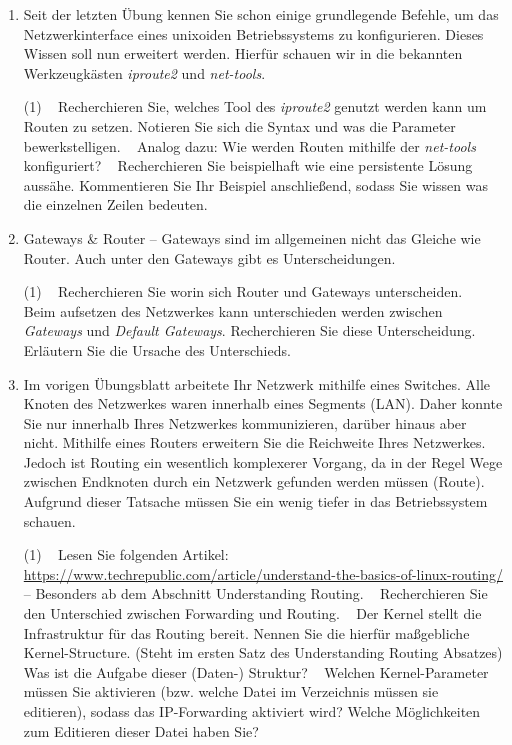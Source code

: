 \documentclass[paper=a4,fontsize=11pt]{scrartcl}%
\numberwithin{equation}{section}
\begin{document}
\begin{enumerate}
	\item Seit der letzten Übung kennen Sie schon einige grundlegende Befehle, um das Netzwerkinterface eines unixoiden Betriebssystems zu konfigurieren. Dieses Wissen soll nun erweitert werden. Hierfür schauen wir in die bekannten Werkzeugkästen \emph{iproute2} und \emph{net-tools}.
	\begin{tasks}(1)
	\task~ Recherchieren Sie, welches Tool des \emph{iproute2} genutzt werden kann um Routen zu setzen. Notieren Sie sich die Syntax und was die Parameter bewerkstelligen.
	\task~ Analog dazu: Wie werden Routen mithilfe der \emph{net-tools} konfiguriert?
	\task~ Recherchieren Sie beispielhaft wie eine persistente Lösung aussähe. Kommentieren Sie Ihr Beispiel anschließend, sodass Sie wissen was die einzelnen Zeilen bedeuten.
	\end{tasks}
	\item Gateways \& Router -- Gateways sind im allgemeinen nicht das Gleiche wie Router. Auch unter den Gateways gibt es Unterscheidungen.
	\begin{tasks}(1)
	\task~ Recherchieren Sie worin sich Router und Gateways unterscheiden.
	\task~ Beim aufsetzen des Netzwerkes kann unterschieden werden zwischen \emph{Gateways} und \emph{Default Gateways}. Recherchieren Sie diese Unterscheidung. Erläutern Sie die Ursache des Unterschieds.
	\end{tasks}
	\item Im vorigen Übungsblatt arbeitete Ihr Netzwerk mithilfe eines Switches. Alle Knoten des Netzwerkes waren innerhalb eines Segments (LAN). Daher konnte Sie nur innerhalb Ihres Netzwerkes kommunizieren, darüber hinaus aber nicht. Mithilfe eines Routers erweitern Sie die Reichweite Ihres Netzwerkes. Jedoch ist Routing ein wesentlich komplexerer Vorgang, da in der Regel Wege zwischen Endknoten durch ein Netzwerk gefunden werden müssen (Route). Aufgrund dieser Tatsache müssen Sie ein wenig tiefer in das Betriebssystem schauen.
	\begin{tasks}(1)
	\task~ Lesen Sie folgenden Artikel: \url{https://www.techrepublic.com/article/understand-the-basics-of-linux-routing/} -- Besonders ab dem Abschnitt \glqq Understanding Routing\grqq.
	\task~ Recherchieren Sie den Unterschied zwischen Forwarding und Routing.
	\task~ Der Kernel stellt die Infrastruktur für das Routing bereit. Nennen Sie die hierfür maßgebliche Kernel-Structure. (Steht im ersten Satz des Understanding Routing Absatzes) Was ist die Aufgabe dieser (Daten-) Struktur?
	\task~ Welchen Kernel-Parameter müssen Sie aktivieren (bzw. welche Datei im  Verzeichnis müssen sie editieren), sodass das IP-Forwarding aktiviert wird? Welche Möglichkeiten zum Editieren dieser Datei haben Sie?

\end{tasks}
\end{enumerate}
\end{document}
